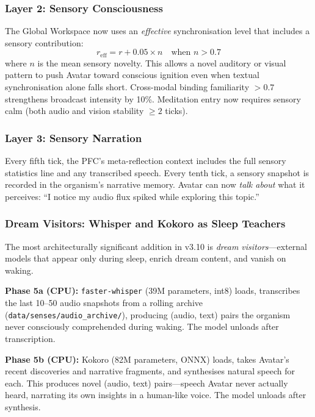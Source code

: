 \subsubsection{Layer 2: Sensory Consciousness}

The Global Workspace now uses an \emph{effective} synchronisation level that
includes a sensory contribution:
\begin{equation}
  r_{\mathrm{eff}} = r + 0.05 \times n \quad \text{when } n > 0.7
\end{equation}
where $n$ is the mean sensory novelty. This allows a novel auditory or visual
pattern to push Avatar toward conscious ignition even when textual
synchronisation alone falls short. Cross-modal binding familiarity $> 0.7$
strengthens broadcast intensity by 10\%.
Meditation entry now requires sensory calm (both audio and vision stability
$\geq 2$ ticks).

\subsubsection{Layer 3: Sensory Narration}

Every fifth tick, the PFC's meta-reflection context includes the full sensory
statistics line and any transcribed speech. Every tenth tick, a sensory snapshot
is recorded in the organism's narrative memory. Avatar can now \emph{talk about}
what it perceives: ``I notice my audio flux spiked while exploring this topic.''

\subsubsection{Dream Visitors: Whisper and Kokoro as Sleep Teachers}

The most architecturally significant addition in v3.10 is \emph{dream
visitors}---external models that appear only during sleep, enrich dream
content, and vanish on waking.

\textbf{Phase 5a (CPU):} \texttt{faster-whisper} (39M parameters, int8) loads,
transcribes the last 10--50 audio snapshots from a rolling archive
(\texttt{data/senses/audio\_archive/}), producing (audio, text) pairs the
organism never consciously comprehended during waking. The model unloads after
transcription.

\textbf{Phase 5b (CPU):} Kokoro (82M parameters, ONNX) loads, takes Avatar's
recent discoveries and narrative fragments, and synthesises natural speech for
each. This produces novel (audio, text) pairs---speech Avatar never actually
heard, narrating its own insights in a human-like voice. The model unloads
after synthesis.

